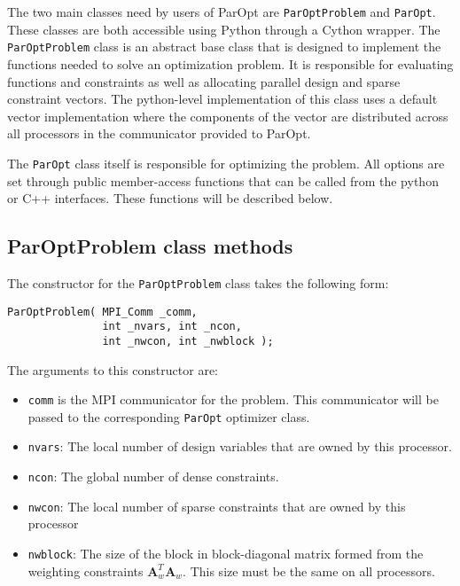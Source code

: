 \documentclass[12pt]{article}
\newcommand{\mb}{\mathbf}
\begin{document}
The two main classes need by users of ParOpt are \texttt{ParOptProblem} and \texttt{ParOpt}.
These classes are both accessible using Python through a Cython wrapper.
The \texttt{ParOptProblem} class is an abstract base class that is designed to implement the functions needed to solve an optimization problem.
It is responsible for evaluating functions and constraints as well as allocating parallel design and sparse constraint vectors.
The python-level implementation of this class uses a default vector implementation where the components of the vector are distributed across all processors in the communicator provided to ParOpt.

The \texttt{ParOpt} class itself is responsible for optimizing the problem.
All options are set through public member-access functions that can be called from the python or C++ interfaces.
These functions will be described below.

\subsection{ParOptProblem class methods}

The constructor for the \texttt{ParOptProblem} class takes the following form:
%
\begin{verbatim}
ParOptProblem( MPI_Comm _comm,
               int _nvars, int _ncon,
               int _nwcon, int _nwblock );
\end{verbatim}

The arguments to this constructor are:
\begin{itemize}
\item \texttt{comm} is the MPI communicator for the problem.
This communicator will be passed to the corresponding \texttt{ParOpt} optimizer class.

\item \texttt{nvars}: The local number of design variables that are owned by this processor.

\item \texttt{ncon}: The global number of dense constraints.

\item \texttt{nwcon}: The local number of sparse constraints that are owned by this processor

\item \texttt{nwblock}: The size of the block in block-diagonal matrix formed from the weighting constraints $\mb{A}_{w}^{T}\mb{A}_{w}$. This size must be the same on all processors.
\end{itemize}
\end{document}
